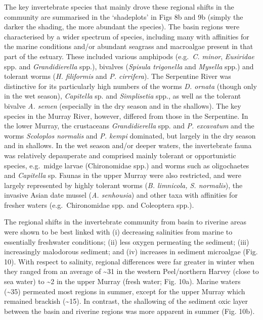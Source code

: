 \documentclass[
]{book}
\begin{document}
The key invertebrate species that mainly drove these regional shifts in the community are summarised in the `shadeplots' in Figs 8b and 9b (simply the darker the shading, the more abundant the species). The basin regions were characterised by a wider spectrum of species, including many with affinities for the marine conditions and/or abundant seagrass and macroalgae present in that part of the estuary. These included various amphipods (e.g.~\emph{C. minor}, \emph{Eusiridae} spp. and \emph{Grandidierella} spp.), bivalves (\emph{Spisula trigonella} and \emph{Mysella} spp.) and tolerant worms (\emph{H. filiformis} and \emph{P. cirrifera}). The Serpentine River was distinctive for its particularly high numbers of the worms \emph{D. ornata} (though only in the wet season), \emph{Capitella} sp. and \emph{Simplisetia} spp., as well as the tolerant bivalve \emph{A. semen} (especially in the dry season and in the shallows). The key species in the Murray River, however, differed from those in the Serpentine. In the lower Murray, the crustaceans \emph{Grandidierella} spp. and \emph{P. excavatum} and the worms \emph{Scoloplos normalis} and \emph{P. kempi} dominated, but largely in the dry season and in shallows. In the wet season and/or deeper waters, the invertebrate fauna was relatively depauperate and comprised mainly tolerant or opportunistic species, e.g.~midge larvae (Chironomidae spp.) and worms such as oligochaetes and \emph{Capitella} sp. Faunas in the upper Murray were also restricted, and were largely represented by highly tolerant worms (\emph{B. limnicola, S. normalis}), the invasive Asian date mussel (\emph{A. senhousia}) and other taxa with affinities for fresher waters (e.g.~Chironomidae spp. and Coleoptera spp.).

The regional shifts in the invertebrate community from basin to riverine areas were shown to be best linked with (i) decreasing salinities from marine to essentially freshwater conditions; (ii) less oxygen permeating the sediment; (iii) increasingly malodorous sediment; and (iv) increases in sediment microalgae (Fig. 10). With respect to salinity, regional differences were far greater in winter when they ranged from an average of \textasciitilde31 in the western Peel/northern Harvey (close to sea water) to \textasciitilde2 in the upper Murray (fresh water; Fig. 10a). Marine waters (\textasciitilde35) permeated most regions in summer, except for the upper Murray which remained brackish (\textasciitilde15). In contrast, the shallowing of the sediment oxic layer between the basin and riverine regions was more apparent in summer (Fig. 10b).
\end{document}
